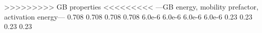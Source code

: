 >>>>>>>>> GB properties <<<<<<<<<
---GB energy, mobility prefactor, activation energy---
0.708 0.708
0.708 0.708
6.0e-6 6.0e-6
6.0e-6 6.0e-6 
0.23	0.23
0.23	0.23
